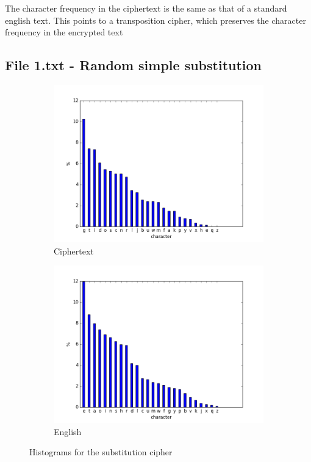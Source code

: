 \documentclass[a4paper]{article}
\begin{document}
        The character frequency in the ciphertext is the same as that of a standard english text.
        This points to a transposition cipher, which preserves the character frequency in the
        encrypted text

    \subsection{File 1.txt - Random simple substitution}

        \begin{figure}[h]
            \centering
            \begin{subfigure}{.5\textwidth}
                \centering
                \includegraphics[width=.9\textwidth]{histogram_sorted_1.png}
                \caption{Ciphertext}
            \end{subfigure}%
            \begin{subfigure}{.5\textwidth}
                \centering
                \includegraphics[width=.9\textwidth]{histogram_sorted_english.png}
                \caption{English}
            \end{subfigure}
            \caption{Histograms for the substitution cipher}
        \end{figure}
\end{document}

